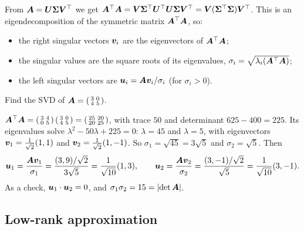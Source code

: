 From $\bm{A} = \bm{U}\bm{\Sigma}\bm{V}^\top$ we get
$\bm{A}^\top\bm{A} = \bm{V}\bm{\Sigma}^\top\bm{U}^\top\bm{U}\bm{\Sigma}\bm{V}^\top =
\bm{V}(\bm{\Sigma}^\top\bm{\Sigma})\bm{V}^\top$. This is an eigendecomposition of the symmetric
matrix $\bm{A}^\top\bm{A}$, so:
\begin{itemize}
  \item the right singular vectors $\bm{v}_i$ are the eigenvectors of
    $\bm{A}^\top\bm{A}$;
  \item the singular values are the square roots of its eigenvalues,
    $\sigma_i = \sqrt{\lambda_i(\bm{A}^\top\bm{A})}$;
  \item the left singular vectors are $\bm{u}_i = \bm{A}\bm{v}_i/\sigma_i$ (for
    $\sigma_i > 0$).
\end{itemize}

\begin{example}\label{ex:svd}
Find the SVD of $\bm{A} = \left(\begin{smallmatrix} 3 & 0\\ 4 &
5\end{smallmatrix}\right)$.

\sol $\bm{A}^\top\bm{A} = \left(\begin{smallmatrix} 3 & 4\\ 0 &
5\end{smallmatrix}\right)\left(\begin{smallmatrix} 3 & 0\\ 4 &
5\end{smallmatrix}\right) = \left(\begin{smallmatrix} 25 & 20\\ 20 &
25\end{smallmatrix}\right)$, with trace $50$ and determinant $625 - 400 =
225$. Its eigenvalues solve $\lambda^2 - 50\lambda + 225 = 0$: $\lambda = 45$ and
$\lambda = 5$, with eigenvectors $\bm{v}_1 = \frac{1}{\sqrt2}(1, 1)$ and
$\bm{v}_2 = \frac{1}{\sqrt2}(1, -1)$. So $\sigma_1 = \sqrt{45} = 3\sqrt5$ and
$\sigma_2 = \sqrt5$. Then
\[
  \bm{u}_1 = \frac{\bm{A}\bm{v}_1}{\sigma_1} = \frac{(3, 9)/\sqrt2}{3\sqrt5}
  = \frac{1}{\sqrt{10}}(1, 3),
  \qquad
  \bm{u}_2 = \frac{\bm{A}\bm{v}_2}{\sigma_2} = \frac{(3, -1)/\sqrt2}{\sqrt5}
  = \frac{1}{\sqrt{10}}(3, -1).
\]
As a check, $\bm{u}_1\cdot\bm{u}_2 = 0$, and
$\sigma_1\sigma_2 = 15 = \lvert\det\bm{A}\rvert$.
\end{example}

\subsection{Low-rank approximation}

